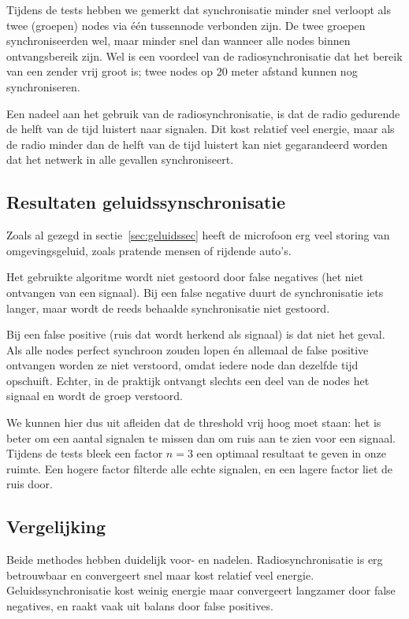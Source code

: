 \documentclass[a4paper,10pt]{article}
\begin{document}
Tijdens de tests hebben we gemerkt dat synchronisatie minder snel verloopt als twee (groepen) nodes via \'e\'en tussennode verbonden zijn. De twee groepen synchroniseerden wel, maar minder snel dan wanneer alle nodes binnen ontvangsbereik zijn. Wel is een voordeel van de radiosynchronisatie dat het bereik van een zender vrij groot is; twee nodes op 20 meter afstand kunnen nog synchroniseren.

Een nadeel aan het gebruik van de radiosynchronisatie, is dat de radio gedurende de helft van de tijd luistert naar signalen. Dit kost relatief veel energie, maar als de radio minder dan de helft van de tijd luistert kan niet gegarandeerd worden dat het netwerk in alle gevallen synchroniseert.

\subsection{Resultaten geluidssynschronisatie}
Zoals al gezegd in sectie~\ref{sec:geluidssec} heeft de microfoon erg veel storing van omgevingsgeluid, zoals pratende mensen of rijdende auto's.

Het gebruikte algoritme wordt niet gestoord door false negatives (het niet ontvangen van een signaal). Bij een false negative duurt de synchronisatie iets langer, maar wordt de reeds behaalde synchronisatie niet gestoord.

Bij een false positive (ruis dat wordt herkend als signaal) is dat niet het geval. Als alle nodes perfect synchroon zouden lopen \'en allemaal de false positive ontvangen worden ze niet verstoord, omdat iedere node dan dezelfde tijd opschuift. Echter, in de praktijk ontvangt slechts een deel van de nodes het signaal en wordt de groep verstoord.

We kunnen hier dus uit afleiden dat de threshold vrij hoog moet staan: het is beter om een aantal signalen te missen dan om ruis aan te zien voor een signaal. Tijdens de tests bleek een factor $n=3$ een optimaal resultaat te geven in onze ruimte. Een hogere factor filterde alle echte signalen, en een lagere factor liet de ruis door.

\subsection{Vergelijking}
Beide methodes hebben duidelijk voor- en nadelen. Radiosynchronisatie is erg betrouwbaar en convergeert snel maar kost relatief veel energie. Geluidssynchronisatie kost weinig energie maar convergeert langzamer door false negatives, en raakt vaak uit balans door false positives.
\end{document}
